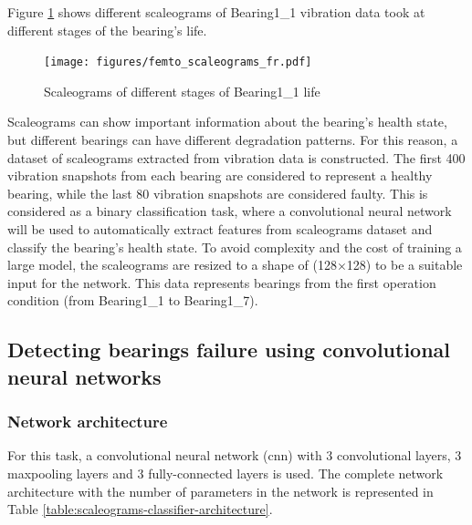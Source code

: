 Figure \ref{fig:bearings_fault_progress_scaleograms} shows different scaleograms of Bearing1\_1 vibration data took at different stages of the bearing's life.

\begin{figure}[h]
	\centering
	\texttt{[image: figures/femto\_scaleograms\_fr.pdf]}
	\caption{Scaleograms of different stages of Bearing1\_1 life}%
	\label{fig:bearings_fault_progress_scaleograms}
\end{figure}

Scaleograms can show important information about the bearing's health state, but different bearings can have different degradation patterns. For this reason, a dataset of scaleograms extracted from vibration data is constructed. The first 400 vibration snapshots from each bearing are considered to represent a healthy bearing, while the last 80 vibration snapshots are considered faulty. This is considered as a binary classification task, where a convolutional neural network will be used to automatically extract features from scaleograms dataset and classify the bearing's health state. To avoid complexity and the cost of training a large model, the scaleograms are resized to a shape of (128$\times$128) to be a suitable input for the network. This data represents bearings from the first operation condition (from Bearing1\_1 to Bearing1\_7).

\subsection{Detecting bearings failure using convolutional neural networks}%
\label{sub:detecting_bearings_failure_using_convolutional_neural_networks}


\subsubsection{Network architecture}%
\label{subsub:network_architecture}
For this task, a convolutional neural network (\acrshort{cnn}) with 3 convolutional layers, 3 maxpooling layers and 3 fully-connected layers is used. The complete network architecture with the number of parameters in the network is represented in Table \ref{table:scaleograms-classifier-architecture}.

